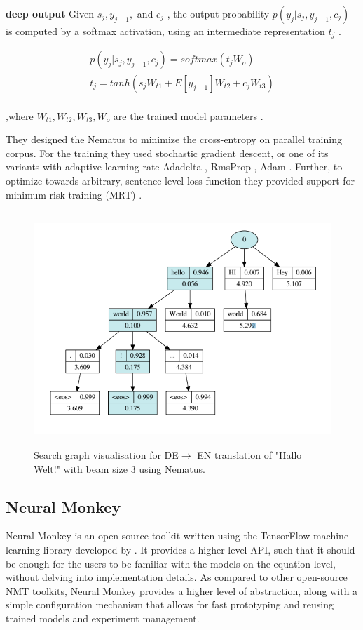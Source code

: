 \textbf{deep output} Given $s_j , y_{j-1},$ and $c_j$ , the output probability $p(y_j|s_j , y_{j-1}, c_j )$ is computed by a softmax activation, using an intermediate representation $t_j$ . 

\begin{align*}
p(y_j|s_j , y_{j-1}, c_j ) = softmax (t_jW_o)\\
t_j=tanh (s_jW_{t1} + E[y_{j-1}]W_{t2} + c_jW_{t3}) \\
\end{align*}

,where $W_{t1},W_{t2},W_{t3},W_o$ are the trained model parameters \citep{DBLP:journals/corr/SennrichFCBHHJL17}.

They designed the Nematus to minimize the cross-entropy on parallel training corpus. For the training they used stochastic gradient descent, or one of its variants with adaptive learning rate Adadelta \citep{DBLP:journals/corr/abs-1212-5701}, RmsProp\citep{hinton} , Adam \citep{DBLP:journals/corr/KingmaB14}. Further, to optimize towards arbitrary, sentence level loss function they provided support for minimum risk training (MRT) \citep{DBLP:journals/corr/ShenCHHWSL15}. 

\begin{figure}
\includegraphics[width=\textwidth,height=250pt]{figures/nematus.png}
\caption{ Search graph visualisation for DE$\rightarrow$ EN
translation of "Hallo Welt!" with beam size 3 using Nematus\citep{DBLP:journals/corr/SennrichFCBHHJL17}.} \label{fignm2}
\end{figure}

\subsection{Neural Monkey}
Neural Monkey is an open-source toolkit written using the TensorFlow machine learning library \citep{DBLP:journals/corr/AbadiABBCCCDDDG16} developed by \cite{neuralmonk}. It provides a higher level API, such that it should be enough for the users to be familiar with the models on the equation level, without delving into implementation details. As compared to other open-source NMT toolkits, Neural Monkey provides a higher level of abstraction, along with a simple configuration mechanism that allows for fast prototyping and reusing trained models and experiment management.

